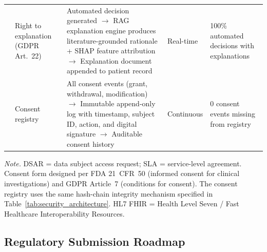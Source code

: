 {\begin{xltabular}{\textwidth}{@{} p{1.0cm} p{2.5cm} p{6.2cm} p{2.0cm} p{2.7cm} @{}}
 & Right to explanation (GDPR Art.~22) & Automated decision generated $\to$ RAG explanation engine produces literature-grounded rationale + SHAP feature attribution $\to$ Explanation document appended to patient record & Real-time & 100\% automated decisions with explanations \\
 & Consent registry & All consent events (grant, withdrawal, modification) $\to$ Immutable append-only log with timestamp, subject ID, action, and digital signature $\to$ Auditable consent history & Continuous & 0 consent events missing from registry \\
\end{xltabular}}
\vspace{0.5em}\noindent\textit{Note.} DSAR = data subject access request; SLA = service-level agreement. Consent form designed per FDA 21~CFR~50 (informed consent for clinical investigations) and GDPR Article~7 (conditions for consent). The consent registry uses the same hash-chain integrity mechanism specified in Table~\ref{tab:security_architecture}. HL7 FHIR = Health Level Seven / Fast Healthcare Interoperability Resources.

\subsection{Regulatory Submission Roadmap}

